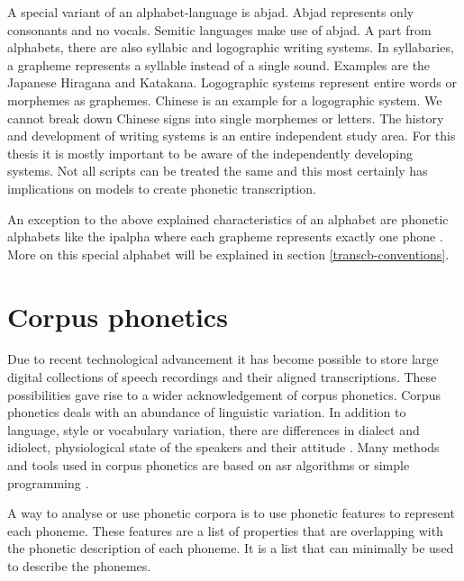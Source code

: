 A special variant of an alphabet-language is abjad. Abjad represents only consonants and no vocals. Semitic languages make use of abjad. A part from alphabets, there are also syllabic and logographic writing systems. In syllabaries, a grapheme represents a syllable instead of a single sound. Examples are the Japanese Hiragana and Katakana. Logographic systems represent entire words or morphemes as graphemes. Chinese is an example for a logographic system. We cannot break down Chinese signs into single morphemes or letters. The history and development of writing systems is an entire independent study area. For this thesis it is mostly important to be aware of the independently developing systems. Not all scripts can be treated the same and this most certainly has implications on models to create phonetic transcription. 


An exception to the above explained characteristics of an alphabet are phonetic alphabets like the \ac{ipalpha} where each grapheme represents exactly one phone  \citep{writing-systems}. More on this special alphabet will be explained in section \ref{transcb-conventions}.



\section{Corpus phonetics}
Due to recent technological advancement it has become possible to store large digital collections of speech recordings and their aligned transcriptions. These possibilities gave rise to a wider acknowledgement of corpus phonetics. Corpus phonetics deals with an abundance of linguistic variation. In addition to language, style or vocabulary variation, there are differences in dialect and idiolect, physiological state of the speakers and their attitude \citep{Liberman.2019, Chodroff.19.07.2019}. Many methods and tools used in corpus phonetics are based on \ac{asr} algorithms or simple programming \citep{Chodroff.19.07.2019}.

A way to analyse or use phonetic corpora is to use phonetic features to represent each phoneme. These features are a list of properties that are overlapping with the phonetic description of each phoneme. It is a list that can minimally be used to describe the phonemes. 

